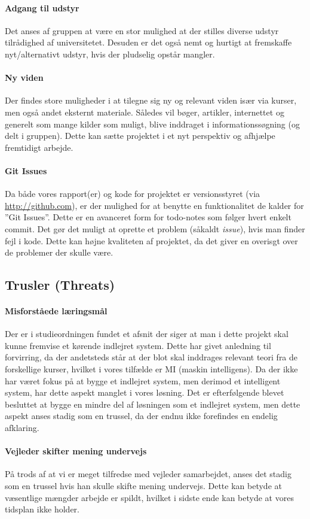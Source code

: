 \paragraph{Adgang til udstyr}
Det anses af gruppen at være en stor mulighed at der stilles diverse udstyr tilrådighed af universitetet.
Desuden er det også nemt og hurtigt at fremskaffe nyt/alternativt udstyr, hvis der pludselig opstår mangler.

\paragraph{Ny viden}\label{swot:ny_viden}
Der findes store muligheder i at tilegne sig ny og relevant viden især via kurser, men også andet eksternt materiale.
Således vil bøger, artikler, internettet og generelt som mange kilder som muligt, blive inddraget i informationssøgning (og delt i gruppen).
Dette kan sætte projektet i et nyt perspektiv og afhjælpe fremtidigt arbejde.

\paragraph{Git Issues}
Da både vores rapport(er) og kode for projektet er versionsstyret (via \url{http://github.com}), er der mulighed for at benytte en funktionalitet de kalder for ''Git Issues''.
Dette er en avanceret form for todo-notes som følger hvert enkelt commit.
Det gør det muligt at oprette et problem (såkaldt \textit{issue}), hvis man finder fejl i kode.
Dette kan højne kvaliteten af projektet, da det giver en overisgt over de problemer der skulle være.

\subsection{Trusler \textnormal{(\textbf{T}hreats)}}

\paragraph{Misforståede læringsmål}\label{swot:laeringsmaal}
Der er i studieordningen fundet et afsnit der siger at man i dette projekt skal kunne fremvise et kørende indlejret system.
Dette har givet anledning til forvirring, da der andetsteds står at der blot skal inddrages relevant teori fra de forskellige kurser, hvilket i vores tilfælde er MI (maskin intelligens).
Da der ikke har været fokus på at bygge et indlejret system, men derimod et intelligent system, har dette aspekt manglet i vores løsning.
Det er efterfølgende blevet besluttet at bygge en mindre del af løsningen som et indlejret system, men dette aspekt anses stadig som en trussel, da der endnu ikke forefindes en endelig afklaring.

\paragraph{Vejleder skifter mening undervejs}\label{swot:vejleder}
På trods af at vi er meget tilfredse med vejleder samarbejdet, anses det stadig som en trussel hvis han skulle skifte mening undervejs.
Dette kan betyde at væsentlige mængder arbejde er spildt, hvilket i sidste ende kan betyde at vores tidsplan ikke holder.

